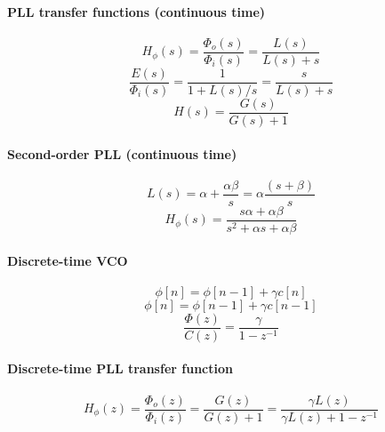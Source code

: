 \paragraph{PLL transfer functions (continuous time)}
\begin{equation}
H_{\phi}(s) = \frac{\Phi_o(s)}{\Phi_i(s)} = \frac{L(s)}{L(s)+s}
\label{eq:pllTransferFunction}
\end{equation}
\begin{equation}
\frac{E(s)}{\Phi_i(s)} = \frac{1}{1+L(s)/s} = \frac{s}{L(s)+s}
\label{eq:pllErrorTrFun}
\end{equation}
\begin{equation}
H(s)=\frac{G(s)}{G(s)+1}
\label{eq:feedbackControl}
\end{equation}

\paragraph{Second-order PLL (continuous time)}
\begin{equation}
L(s) = \alpha + \frac{\alpha \beta}{s} = \alpha \frac{(s + \beta)}{s}
\label{eq:pllSecondOrder}
\end{equation}
\begin{equation}
H_{\phi}(s) = \frac{s \alpha + \alpha \beta}{s^2 + \alpha s + \alpha \beta}
\label{eq:pllSecondOrder2}
\end{equation}

\paragraph{Discrete-time VCO}
\begin{equation}
\phi[n] = \phi[n-1] + \gamma c[n]
\label{eq:vcoControlDiscreteTime}
\end{equation}
\begin{equation}
\phi[n] = \phi[n-1] + \gamma c[n-1]
\label{eq:vcoControlDiscreteTime2}
\end{equation}
\begin{equation}
\frac{\Phi(z)}{C(z)} = \frac{\gamma}{1-z^{-1}}
\label{eq:vcoControlZtransform}
\end{equation}

\paragraph{Discrete-time PLL transfer function}
\begin{equation}
H_{\phi}(z) = \frac{\Phi_o(z)}{\Phi_i(z)} = \frac{G(z)}{G(z)+1} = \frac{\gamma L(z)}{\gamma L(z)+1-z^{-1}}
\label{eq:pllTransferFunctionDiscreteTime}
\end{equation}


